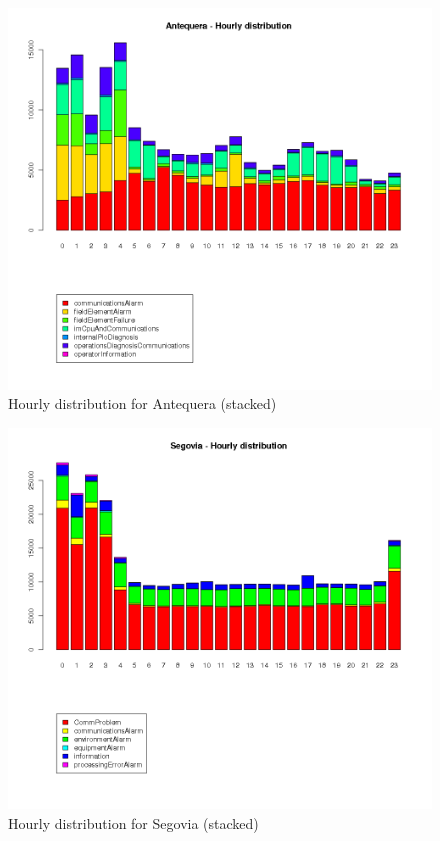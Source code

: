 \begin{figure}[htb]
 \centering
 \includegraphics[width=\textwidth]{./img/antequera_timeline.png}
 \caption{Hourly distribution for Antequera (stacked)} \label{fig:antequera_timeline}
\end{figure}
\begin{figure}[htb]
 \centering
 \includegraphics[width=\textwidth]{./img/segovia_timeline.png}
 \caption{Hourly distribution for Segovia (stacked)} \label{fig:segovia_timeline}
\end{figure}
